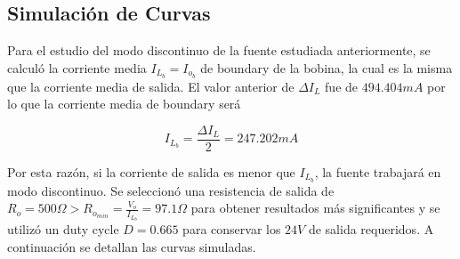 %

%

\subsection{Simulación de Curvas}

Para el estudio del modo discontinuo de la fuente estudiada anteriormente, se calculó la corriente media $I_{L_b} = I_{o_b}$ de boundary de la bobina, la cual es la misma que la corriente media de salida. El valor anterior de $\Delta I_L$ fue de $494.404mA$ por lo que la corriente media de boundary será

\begin{equation}
I_{L_b} = \frac{\Delta I_L}{2} = 247.202mA
\label{ej4:eq:il_boundary}
\end{equation}

Por esta razón, si la corriente de salida es menor que $I_{L_b}$, la fuente trabajará en modo discontinuo. Se seleccionó una resistencia de salida de $R_o = 500\Omega > R_{o_{min}} = \frac{V_o}{I_{L_b}} = 97.1\Omega$ para obtener resultados más significantes y se utilizó un duty cycle $D = 0.665$ para conservar los $24V$ de salida requeridos. A continuación se detallan las curvas simuladas.

